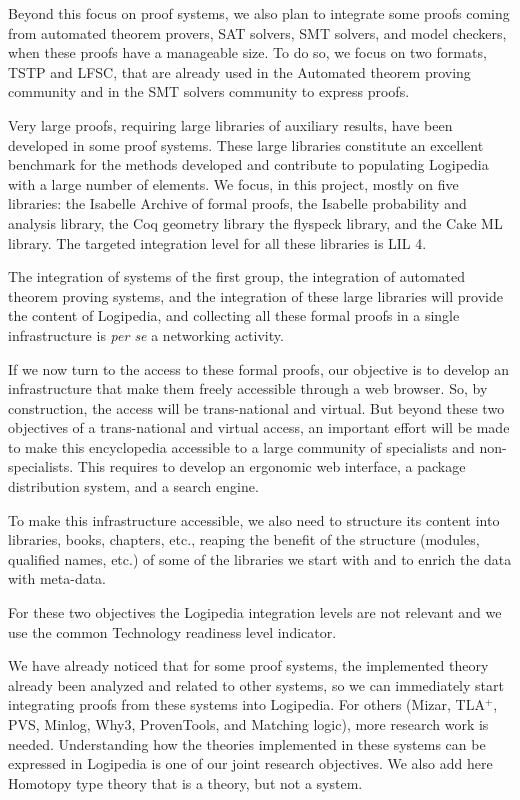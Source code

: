 Beyond this focus on proof systems, we also plan to integrate some
proofs coming from automated theorem provers, SAT solvers, SMT
solvers, and model checkers, when these proofs have a manageable
size. To do so, we focus on two formats, TSTP and LFSC, that are
already used in the Automated theorem proving community and in the SMT
solvers community to express proofs.

Very large proofs, requiring large libraries of auxiliary results,
have been developed in some proof systems. These large libraries
constitute an excellent benchmark for the methods developed and
contribute to populating Logipedia with a large number of elements.
We focus, in this project, mostly on five libraries: the Isabelle
Archive of formal proofs, the Isabelle probability and analysis
library, the Coq geometry library the flyspeck library, and the Cake
ML library.  The targeted integration level for all these libraries is
LIL 4.

The integration of systems of the first group, the integration of
automated theorem proving systems, and the integration of these large
libraries will provide the content of Logipedia, and collecting all
these formal proofs in a single infrastructure is {\em per se} a
networking activity.

If we now turn to the access to these formal proofs, our objective is
to develop an infrastructure that make them freely accessible through
a web browser. So, by construction, the access will be trans-national
and virtual. But beyond these two objectives of a trans-national and
virtual access, an important effort will be made to make this
encyclopedia accessible to a large community of specialists and
non-specialists.  This requires to develop an ergonomic web interface,
a package distribution system, and a search engine.

To make this infrastructure accessible, we also need to structure its
content into libraries, books, chapters, etc., reaping the benefit of
the structure (modules, qualified names, etc.) of some of the
libraries we start with and to enrich the data with meta-data.

For these two objectives the Logipedia integration levels are not
relevant and we use the common Technology readiness level indicator.

We have already noticed that for some proof systems, the implemented
theory already been analyzed and related to other systems, so we can
immediately start integrating proofs from these systems into
Logipedia. For others (Mizar, TLA$^+$, PVS, Minlog, Why3, ProvenTools, and
Matching logic), more research work is needed. Understanding how the
theories implemented in these systems can be expressed in Logipedia is
one of our joint research objectives.  We also add here Homotopy type
theory that is a theory, but not a system.


